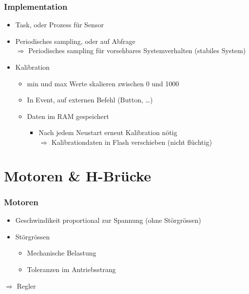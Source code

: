 \documentclass[usenames, dvipsnames]{beamer}
\begin{document}
\begin{frame}
	\frametitle{Implementation}
	\begin{itemize}
		\item{Task, oder Prozess für Sensor}
		\item{Periodisches sampling, oder auf Abfrage\\
		$\Rightarrow$ Periodisches sampling für vorsehbares Systemverhalten (stabiles System)}
		\item{Kalibration}
		\begin{itemize}
			\item{min und max Werte skalieren zwischen 0 und 1000}
			\item{In Event, auf externen Befehl (Button, \dots)}
			\item{Daten im RAM gespeichert}
			\begin{itemize}
				\item{Nach jedem Neustart erneut Kalibration nötig \\
				$\Rightarrow$ Kalibrationdaten in Flash verschieben (nicht flüchtig)}
			\end{itemize}
		\end{itemize}

	\end{itemize}
\end{frame}


\section{Motoren \& H-Brücke} %
\begin{frame}
	\frametitle{Motoren}
	\begin{itemize}
		\item{Geschwindikeit proportional zur Spannung (ohne Störgrössen)}
		\item{Störgrössen}
		\begin{itemize}
			\item{Mechanische Belastung}
			\item{Toleranzen im Antriebsstrang}
		\end{itemize}
	\end{itemize}

	\begin{exampleblock}{}
		\centering
		$\Rightarrow$ Regler
	\end{exampleblock}
	
\end{frame}
\end{document}
